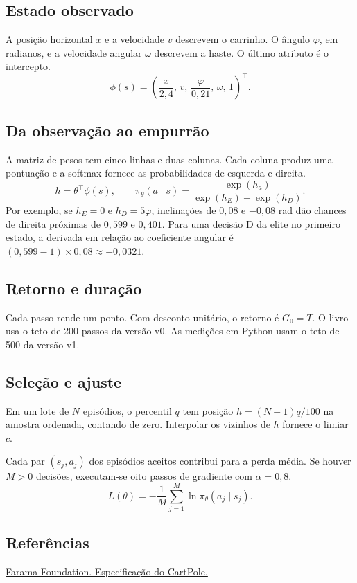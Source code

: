 \subsection*{Estado observado}
A posição horizontal $x$ e a velocidade $v$ descrevem o carrinho. O ângulo $\varphi$, em radianos, e a velocidade angular $\omega$ descrevem a haste. O último atributo é o intercepto.
\[
 \phi(s)=\left(\frac{x}{2{,}4},\,v,\,\frac{\varphi}{0{,}21},\,\omega,\,1\right)^\top .
\]

\subsection*{Da observação ao empurrão}
A matriz de pesos tem cinco linhas e duas colunas. Cada coluna produz uma pontuação e a softmax fornece as probabilidades de esquerda e direita.
\[
 h=\theta^\top\phi(s),\qquad \pi_\theta(a\mid s)=\frac{\exp(h_a)}{\exp(h_E)+\exp(h_D)}.
\]
Por exemplo, se $h_E=0$ e $h_D=5\varphi$, inclinações de $0{,}08$ e $-0{,}08$ rad dão chances de direita próximas de $0{,}599$ e $0{,}401$. Para uma decisão D da elite no primeiro estado, a derivada em relação ao coeficiente angular é $(0{,}599-1)\times0{,}08\approx-0{,}0321$.

\subsection*{Retorno e duração}
Cada passo rende um ponto. Com desconto unitário, o retorno é $G_0=T$. O livro usa o teto de 200 passos da versão v0. As medições em Python usam o teto de 500 da versão v1.

\subsection*{Seleção e ajuste}
Em um lote de $N$ episódios, o percentil $q$ tem posição $h=(N-1)q/100$ na amostra ordenada, contando de zero. Interpolar os vizinhos de $h$ fornece o limiar $c$.

Cada par $(s_j,a_j)$ dos episódios aceitos contribui para a perda média. Se houver $M>0$ decisões, executam-se oito passos de gradiente com $\alpha=0{,}8$.
\[
 L(\theta)=-\frac{1}{M}\sum_{j=1}^{M}\ln\pi_\theta(a_j\mid s_j).
\]


\subsection*{Referências}
\noindent \href{https://gymnasium.farama.org/environments/classic_control/cart_pole/}{Farama Foundation. Especificação do CartPole.}

